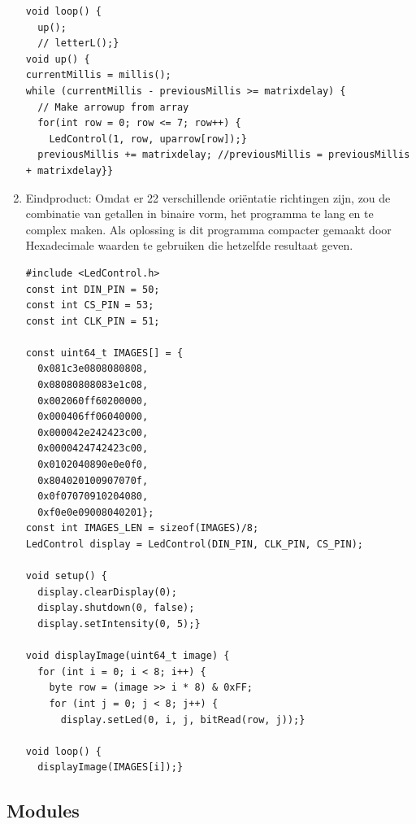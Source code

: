 \begin{enumerate}
\begin{lstlisting}
void loop() { 
  up();
  // letterL();}
void up() {
currentMillis = millis();  
while (currentMillis - previousMillis >= matrixdelay) {
  // Make arrowup from array
  for(int row = 0; row <= 7; row++) {
    LedControl(1, row, uparrow[row]);}  
  previousMillis += matrixdelay; //previousMillis = previousMillis + matrixdelay}}
    \end{lstlisting}
    \item Eindproduct: Omdat er 22 verschillende oriëntatie richtingen zijn, zou de combinatie van getallen in binaire vorm, het programma te lang en te complex maken. Als oplossing  is dit programma compacter gemaakt door Hexadecimale waarden te gebruiken die hetzelfde resultaat geven.
    \begin{lstlisting}
#include <LedControl.h>
const int DIN_PIN = 50;
const int CS_PIN = 53;
const int CLK_PIN = 51;

const uint64_t IMAGES[] = {
  0x081c3e0808080808,
  0x08080808083e1c08,
  0x002060ff60200000,
  0x000406ff06040000,
  0x000042e242423c00,
  0x0000424742423c00,
  0x0102040890e0e0f0,
  0x804020100907070f,
  0x0f07070910204080,
  0xf0e0e09008040201};
const int IMAGES_LEN = sizeof(IMAGES)/8;
LedControl display = LedControl(DIN_PIN, CLK_PIN, CS_PIN);

void setup() {
  display.clearDisplay(0);
  display.shutdown(0, false);
  display.setIntensity(0, 5);}

void displayImage(uint64_t image) {
  for (int i = 0; i < 8; i++) {
    byte row = (image >> i * 8) & 0xFF;
    for (int j = 0; j < 8; j++) {
      display.setLed(0, i, j, bitRead(row, j));}
    
void loop() {
  displayImage(IMAGES[i]);}
    \end{lstlisting}
\end{enumerate}
\vspace{80mm} %
\subsection{Modules}
